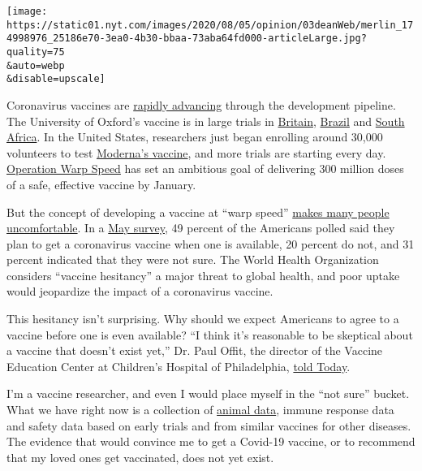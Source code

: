 \texttt{[image: https://static01.nyt.com/images/2020/08/05/opinion/03deanWeb/merlin\_174998976\_25186e70-3ea0-4b30-bbaa-73aba64fd000-articleLarge.jpg?quality=75\\\&auto=webp\\\&disable=upscale]}

Coronavirus vaccines are
\href{https://www.nytimes.com/interactive/2020/science/coronavirus-vaccine-tracker.html}{rapidly
advancing} through the development pipeline. The University of Oxford's
vaccine is in large trials in
\href{https://www.ox.ac.uk/news/2020-05-22-oxford-covid-19-vaccine-begin-phase-iiiii-human-trials}{Britain},
\href{https://www.ox.ac.uk/news/2020-06-28-trial-oxford-covid-19-vaccine-starts-brazil}{Brazil}
and
\href{https://www.ovg.ox.ac.uk/news/trial-of-oxford-covid-19-vaccine-in-south-africa-begins}{South
Africa}. In the United States, researchers just began enrolling around
30,000 volunteers to test
\href{https://www.nih.gov/news-events/news-releases/phase-3-clinical-trial-investigational-vaccine-covid-19-begins}{Moderna's
vaccine}, and more trials are starting every day.
\href{https://www.hhs.gov/about/news/2020/06/16/fact-sheet-explaining-operation-warp-speed.html}{Operation
Warp Speed} has set an ambitious goal of delivering 300 million doses of
a safe, effective vaccine by January.

But the concept of developing a vaccine at ``warp speed''
\href{https://www.nytimes.com/2020/07/18/health/coronavirus-anti-vaccine.html}{makes
many people uncomfortable}. In a
\href{https://apnorc.org/projects/expectations-for-a-covid-19-vaccine/}{May
survey}, 49 percent of the Americans polled said they plan to get a
coronavirus vaccine when one is available, 20 percent do not, and 31
percent indicated that they were not sure. The World Health Organization
considers ``vaccine hesitancy'' a major threat to global health, and
poor uptake would jeopardize the impact of a coronavirus vaccine.

This hesitancy isn't surprising. Why should we expect Americans to agree
to a vaccine before one is even available? ``I think it's reasonable to
be skeptical about a vaccine that doesn't exist yet,'' Dr. Paul Offit,
the director of the Vaccine Education Center at Children's Hospital of
Philadelphia,
\href{https://www.today.com/health/when-will-vaccine-be-ready-covid-19-speed-causes-safety-t187727}{told
Today}.

I'm a vaccine researcher, and even I would place myself in the ``not
sure'' bucket. What we have right now is a collection of
\href{https://news.harvard.edu/gazette/story/2020/05/vaccines-found-that-may-protect-against-covid-19-in-animal-models/}{animal
data}, immune response data and safety data based on early trials and
from similar vaccines for other diseases. The evidence that would
convince me to get a Covid-19 vaccine, or to recommend that my loved
ones get vaccinated, does not yet exist.

